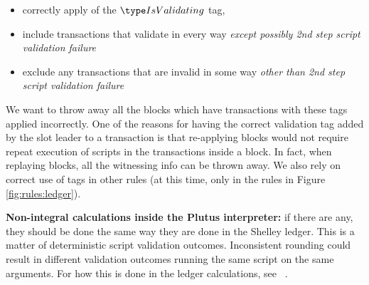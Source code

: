 \begin{itemize}
  \item correctly apply of the $\IsValidating$ tag,
  \item include transactions that validate in every way
  \textit{except possibly 2nd step script validation failure}
  \item exclude any transactions that are invalid
in some way \textit{other than 2nd step script validation failure}
\end{itemize}

We want to
throw away all the blocks which have transactions with these tags
applied incorrectly.
One of the reasons for having the correct validation tag added by the slot leader
to a transaction is that re-applying blocks would not require repeat
execution of scripts in the transactions inside a block. In fact, when replaying
blocks, all the witnessing info can be thrown away.
We also rely on correct use of tags in other rules (at this time, only in
the rules in Figure \ref{fig:rules:ledger}).

\begin{note}
\textbf{Non-integral calculations inside the Plutus interpreter:} if there are any, they should
be done the same way they are done in the Shelley ledger. This is a matter of
deterministic script validation outcomes. Inconsistent rounding could
result in different validation outcomes running the same script on the same
arguments. For how this is done in the ledger calculations, see
~\cite{non_int}.
\end{note}


